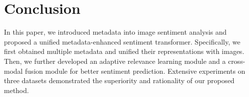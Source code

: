 \section{Conclusion}
\label{s:conclusion}

In this paper, we introduced metadata into image sentiment analysis and proposed a unified metadata-enhanced sentiment transformer.
Specifically, we first obtained multiple metadata and unified their representations with images. Then, we further developed an adaptive relevance learning module and a cross-modal fusion module for better sentiment prediction.
Extensive experiments on three datasets demonstrated the superiority and rationality of our proposed method.

